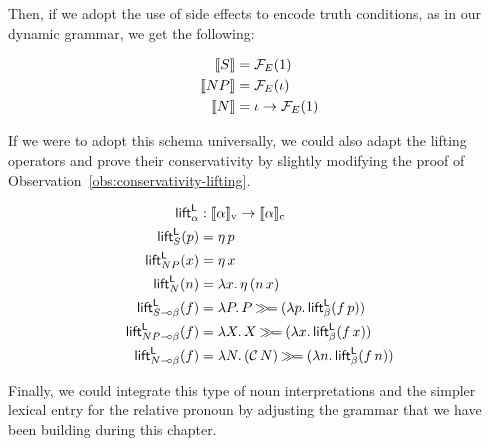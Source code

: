 Then, if we adopt the use of side effects to encode truth conditions, as in
our dynamic grammar, we get the following:

\begin{align*}
  \llbracket S \rrbracket &= \mathcal{F}_E(1) \\
  \llbracket NP \rrbracket &= \mathcal{F}_E(\iota) \\
  \llbracket N \rrbracket &= \iota \to \mathcal{F}_E(1)
\end{align*}

If we were to adopt this schema universally, we could also adapt the
lifting operators and prove their conservativity by slightly modifying the
proof of Observation~\ref{obs:conservativity-lifting}.

\begin{align*}
  \textsf{lift}^{\textsf{L}}_\alpha &: \llbracket \alpha \rrbracket_{\mathrm{v}} \to \llbracket \alpha \rrbracket_{\mathrm{c}} \\
  \textsf{lift}^{\textsf{L}}_{S}(p) &= \eta\,p \\
  \textsf{lift}^{\textsf{L}}_{NP}(x) &= \eta\,x \\
  \textsf{lift}^{\textsf{L}}_{N}(n) &= \lambda x.\, \eta\,(n\,x) \\
  \textsf{lift}^{\textsf{L}}_{S \mathbin{{-}\mkern-3.5mu{\circ}} \beta}(f) &= \lambda P.\, P \mathbin{\gg\!=} (\lambda p.\, \textsf{lift}^{\textsf{L}}_\beta(f\,p)) \\
  \textsf{lift}^{\textsf{L}}_{NP \mathbin{{-}\mkern-3.5mu{\circ}} \beta}(f) &= \lambda X.\, X \mathbin{\gg\!=} (\lambda x.\, \textsf{lift}^{\textsf{L}}_\beta(f\,x)) \\
  \textsf{lift}^{\textsf{L}}_{N \mathbin{{-}\mkern-3.5mu{\circ}} \beta}(f) &= \lambda N.\, (\mathcal{C}\,N) \mathbin{\gg\!=} (\lambda n.\, \textsf{lift}^{\textsf{L}}_\beta(f\,n))
\end{align*}

Finally, we could integrate this type of noun interpretations and the
simpler lexical entry for the relative pronoun by adjusting the grammar
that we have been building during this chapter.

